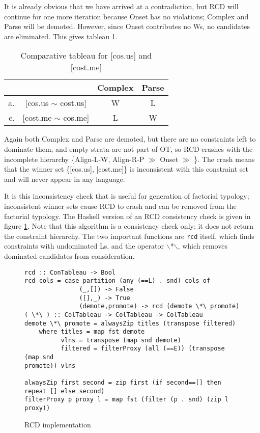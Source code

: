 \documentclass[11pt]{article}
\begin{document}
It is already obvious that we have arrived at a contradiction, but RCD
will continue for one more iteration because {\sc Onset} has no
violations; {\sc *Complex} and {\sc Parse} will be demoted. However,
since {\sc Onset} contributes no Ws, no candidates are
eliminated. This gives tableau \ref{tableau-cmp-cosus-costme-3}.

\begin{table}
\begin{tabular}{|rc||c|c|}\hline
 && {\sc *Complex} & {\sc Parse} \\ \hline\hline
 a. & [cos.us $\sim$ cost.us] & W    & L\\ \hline
 c. & [cost.me $\sim$ cos.me] &L  & W\\ \hline
\end{tabular}
  \caption{Comparative tableau for [cos.us] and [cost.me]}
  \label{tableau-cmp-cosus-costme-3}
\end{table}

Again both {\sc *Complex} and {\sc Parse} are demoted, but there are
no constraints left to dominate them, and empty strata are not part of
OT, so RCD crashes with the incomplete hierarchy \{{\sc Align-L-W,
  Align-R-P} $\gg$ {\sc Onset} $\gg$ \}. The crash means that the
winner set \{[cos.us], [cost.me]\} is inconsistent with this
constraint set and will never appear in any language.

It is this inconsistency check that is useful for generation of
factorial typology; inconsistent winner sets cause RCD to crash and
can be removed from the factorial typology. The Haskell version of an
RCD consistency check is given in figure \ref{haskell-rcd}. Note that
this algorithm is a consistency check only; it does not return the
constraint hierarchy. The two important functions are {\tt rcd}
itself, which finds constraints with undominated Ls, and the operator
$\backslash$*$\backslash$, which removes dominated candidates from
consideration.

\begin{figure}
\begin{verbatim}
rcd :: ConTableau -> Bool
rcd cols = case partition (any (==L) . snd) cols of
               (_,[]) -> False
               ([],_) -> True
               (demote,promote) -> rcd (demote \*\ promote)
( \*\ ) :: ColTableau -> ColTableau -> ColTableau
demote \*\ promote = alwaysZip titles (transpose filtered)
    where titles = map fst demote
          vlns = transpose (map snd demote)
          filtered = filterProxy (all (==E)) (transpose (map snd
promote)) vlns

alwaysZip first second = zip first (if second==[] then repeat [] else second)
filterProxy p proxy l = map fst (filter (p . snd) (zip l proxy))
\end{verbatim}
  \caption{RCD implementation}
  \label{haskell-rcd}
\end{figure}
\end{document}
